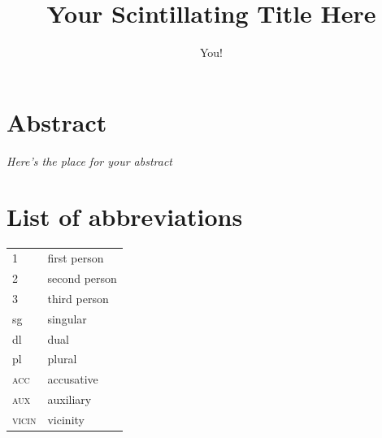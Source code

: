 \documentclass[12pt,twoside]{report}
\title{Your Scintillating Title Here}
\author{You!}
\begin{document}


\afterpage{\blankpage} %

\chapter*{Abstract}
\thispagestyle{empty}
\emph{Here's the place for your abstract}
  \newpage

    \thispagestyle{empty}
    { }

\afterpage{\blankpage}








\singlespacing
{}
\tableofcontents

\listoffigures{}

\clearpage\chapter*{List of abbreviations}

\begin{table}[ht]
\begin{tabular}{l|l}
1      & first person                    \\
2      & second person                   \\
3      & third person                    \\
sg     & singular                        \\
dl     & dual                            \\
pl     & plural                          \\
\textsc{acc}    & accusative                      \\
\textsc{aux}    & auxiliary                       \\
\textsc{vicin}  & vicinity                       
\end{tabular}
\end{table}
\end{document}
